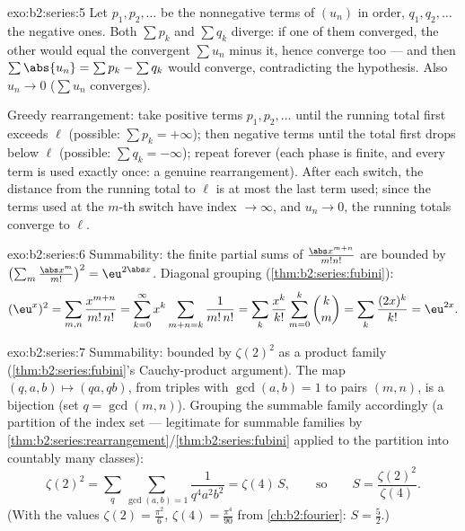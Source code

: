 \begin{solution}{exo:b2:series:5}
Let $p_1, p_2, \dots$ be the nonnegative terms of $(u_n)$ in order,
$q_1, q_2, \dots$ the negative ones. Both $\sum p_k$ and $\sum
q_k$ diverge: if one of them converged, the other would equal the
convergent $\sum u_n$ minus it, hence converge too --- and then
$\sum \abs{u_n} = \sum p_k - \sum q_k$ would converge, contradicting
the hypothesis. Also $u_n \to 0$ ($\sum u_n$ converges).

Greedy rearrangement: take positive terms $p_1, p_2, \dots$ until
the running total first exceeds $\ell$ (possible: $\sum p_k =
+\infty$); then negative terms until the total first drops below
$\ell$ (possible: $\sum q_k = -\infty$); repeat forever (each
phase is finite, and every term is used exactly once: a genuine
rearrangement). After each switch, the distance from the running
total to $\ell$ is at most the last term used; since the terms used
at the $m$-th switch have index $\to \infty$, and $u_n \to 0$,
the running totals converge to $\ell$.
\end{solution}

\begin{solution}{exo:b2:series:6}
Summability: the finite partial sums of
$\frac{\abs x^{m+n}}{m!n!}$ are bounded by $\bigl(\sum_m
\frac{\abs x^m}{m!}\bigr)^2 = \eu^{2\abs x}$. Diagonal grouping
(\cref{thm:b2:series:fubini}):
\[
(\eu^{x})^2 = \sum_{m,n} \frac{x^{m+n}}{m!\,n!}
= \sum_{k=0}^{\infty} x^k \sum_{m+n=k} \frac{1}{m!\,n!}
= \sum_k \frac{x^k}{k!}\sum_{m=0}^{k}\binom km
= \sum_k \frac{(2x)^k}{k!} = \eu^{2x} .
\]
\end{solution}

\begin{solution}{exo:b2:series:7}
Summability: bounded by $\zeta(2)^2$ as a product family
(\cref{thm:b2:series:fubini}'s Cauchy-product argument). The map
$(q, a, b) \mapsto (qa, qb)$, from triples with $\gcd(a, b) = 1$
to pairs $(m, n)$, is a bijection (set $q = \gcd(m,n)$). Grouping
the summable family accordingly (a partition of the index set ---
legitimate for summable families by
\cref{thm:b2:series:rearrangement}/\cref{thm:b2:series:fubini}
applied to the partition into countably many classes):
\[
\zeta(2)^2 = \sum_{q} \sum_{\gcd(a,b)=1} \frac{1}{q^4 a^2 b^2}
= \zeta(4)\, S,
\qquad\text{so}\qquad
S = \frac{\zeta(2)^2}{\zeta(4)} .
\]
(With the values $\zeta(2) = \frac{\pi^2}{6}$,
$\zeta(4) = \frac{\pi^4}{90}$ from
\cref{ch:b2:fourier}: $S = \frac{5}{2}$.)
\end{solution}

